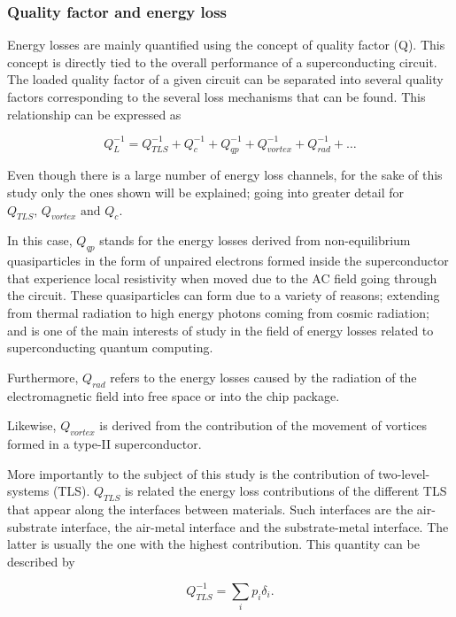 \documentclass[12pt, a4paper]{article}
\begin{document}
\subsubsection{Quality factor and energy loss} \label{Qfactor}

Energy losses are mainly quantified using the concept of quality factor (Q). This concept is directly tied to the overall performance of a superconducting circuit. The loaded quality factor of a given circuit can be separated into several quality factors corresponding to the several loss mechanisms that can be found. This relationship can be expressed as \cite{Charpentier2025}

\begin{equation}
    \label{Q_L}
    Q^{-1}_{L} = Q^{-1}_{TLS} + Q^{-1}_{c} + Q^{-1}_{qp} + Q^{-1}_{vortex} + Q^{-1}_{rad} + \dots
\end{equation}

Even though there is a large number of energy loss channels, for the sake of this study only the ones shown will be explained; going into greater detail for $Q_{TLS} \text{, } Q_{vortex} \text{ and } Q_{c}$.

In this case, $Q_{qp}$ stands for the energy losses derived from non-equilibrium quasiparticles in the form of unpaired electrons formed inside the superconductor that experience local resistivity when moved due to the AC field going through the circuit. These quasiparticles can form due to a variety of reasons; extending from thermal radiation to high energy photons coming from cosmic radiation; and is one of the main interests of study in the field of energy losses related to superconducting quantum computing.

Furthermore, $Q_{rad}$ refers to the energy losses caused by the radiation of the electromagnetic field into free space or into the chip package.

Likewise, $Q_{vortex}$ is derived from the contribution of the movement of vortices formed in a type-II superconductor.

More importantly to the subject of this study is the contribution of two-level-systems (TLS). $Q_{TLS}$ is related the energy loss contributions of the different TLS that appear along the interfaces between materials. Such interfaces are the air-substrate interface, the air-metal interface and the substrate-metal interface. The latter is usually the one with the highest contribution. This quantity can be described by

\begin{equation}
    \label{Q_TLS}
    Q_{TLS}^{-1} = \sum_{i} p_i \delta_i.
\end{equation}
\end{document}
